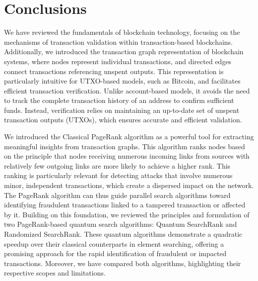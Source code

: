 \documentclass[nofootinbib,aps,prd,reprint,superscriptaddress,floatfix]{revtex4-2}
\begin{document}
\section{Conclusions}\label{sec:Conclusions}

We have reviewed the fundamentals of blockchain technology, focusing on the mechanisms of transaction validation within transaction-based blockchains. Additionally, we introduced the transaction graph representation of blockchain systems, where nodes represent individual transactions, and directed edges connect transactions referencing unspent outputs. This representation is particularly intuitive for UTXO-based models, such as Bitcoin, and facilitates efficient transaction verification. Unlike account-based models, it avoids the need to track the complete transaction history of an address to confirm sufficient funds. Instead, verification relies on maintaining an up-to-date set of unspent transaction outputs (UTXOs), which ensures accurate and efficient validation. 

We introduced the Classical PageRank algorithm as a powerful tool for extracting meaningful insights from transaction graphs. This algorithm ranks nodes based on the principle that nodes receiving numerous incoming links from sources with relatively few outgoing links are more likely to achieve a higher rank. This ranking is particularly relevant for detecting attacks that involve numerous minor, independent transactions, which create a dispersed impact on the network. The PageRank algorithm can thus guide parallel search algorithms toward identifying fraudulent transactions linked to a tampered transaction or affected by it. Building on this foundation, we reviewed the principles and formulation of two PageRank-based quantum search algorithms: Quantum SearchRank and Randomized SearchRank. These quantum algorithms demonstrate a quadratic speedup over their classical counterparts in element searching, offering a promising approach for the rapid identification of fraudulent or impacted transactions. Moreover, we have compared both algorithms, highlighting their respective scopes and limitations.
\end{document}
